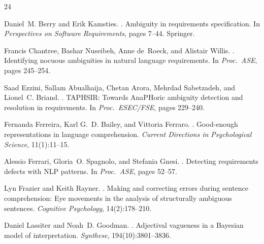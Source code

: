 \documentclass[11pt]{article}
\begin{document}




\begin{thebibliography}{24}

Daniel~M. Berry and Erik Kamsties.
.
\newblock Ambiguity in requirements specification.
\newblock In \emph{Perspectives on Software Requirements}, pages 7--44. Springer.

Francis Chantree, Bashar Nuseibeh, Anne de~Roeck, and Alistair Willis.
.
\newblock Identifying nocuous ambiguities in natural language requirements.
\newblock In \emph{Proc.\ ASE}, pages 245--254.

Saad Ezzini, Sallam Abualhaija, Chetan Arora, Mehrdad Sabetzadeh, and Lionel~C. Briand.
.
\newblock TAPHSIR: Towards AnaPHoric ambiguity detection and resolution in requirements.
\newblock In \emph{Proc.\ ESEC/FSE}, pages 229--240.

Fernanda Ferreira, Karl G.~D. Bailey, and Vittoria Ferraro.
.
\newblock Good-enough representations in language comprehension.
\newblock \emph{Current Directions in Psychological Science}, 11(1):11--15.

Alessio Ferrari, Gloria~O. Spagnolo, and Stefania Gnesi.
.
\newblock Detecting requirements defects with NLP patterns.
\newblock In \emph{Proc.\ ASE}, pages 52--57.

Lyn Frazier and Keith Rayner.
.
\newblock Making and correcting errors during sentence comprehension: Eye movements in the analysis of structurally ambiguous sentences.
\newblock \emph{Cognitive Psychology}, 14(2):178--210.

Daniel Lassiter and Noah~D. Goodman.
.
\newblock Adjectival vagueness in a Bayesian model of interpretation.
\newblock \emph{Synthese}, 194(10):3801--3836.


\end{thebibliography}
\end{document}
